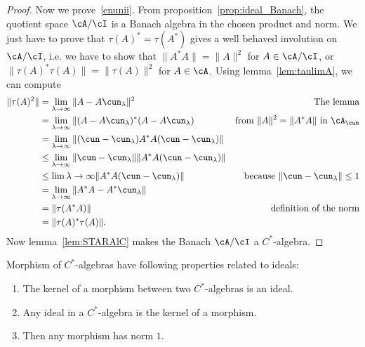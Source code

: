 \begin{proof}
	Now we prove~\ref{enunii}.
	From proposition~\ref{prop:ideal_Banach}, the quotient space $\cA/\cI$ is a Banach algebra in the chosen product and  norm. We just have to prove that $\tau(A)^*=\tau(A^*)$ gives a well behaved involution on $\cA/\cI$, i.e. we have to show that $\| A^*A \|=\| A \|^2$ for $A\in\cA/\cI$, or $\| \tau(A)^*\tau(A) \|=\| \tau(A) \|^2$ for $A\in\cA$. Using lemma~\ref{lem:taulimA}, we can compute
	\begin{equation}
		\begin{aligned}
			\| \tau(A)^2 \| & =\lim_{\lambda\to\infty}\| A-A\cun_{\lambda} \|^2                                   & \textrm{The lemma}                                 \\
			                & =\lim_{\lambda\to\infty}\| (A-A\cun_{\lambda})^*(A-A\cun_{\lambda})                 & \textrm{from $\| A \|^2=\| A^*A \|$
			in $\cA_{\cun}$}                                                                                                                                           \\
			                & =\lim_{\lambda\to\infty}\| (\cun-\cun_{\lambda})A^*A(\cun-\cun_{\lambda}) \|                                                             \\
			                & \leq\lim_{\lambda\to\infty}\| \cun-\cun_{\lambda} \|\| A^*A(\cun-\cun_{\lambda}) \|                                                      \\
			                & \leq\lim{\lambda\to\infty}\| A^*A(\cun-\cun_{\lambda}) \|                           & \textrm{because $\| \cun-\cun_{\lambda} \|\leq 1$} \\
			                & =\lim_{\lambda\to\infty}\| A^*A-A^*\cun_{\lambda} \|                                                                                     \\
			                & =\| \tau(A^*A) \|                                                                   & \textrm{definition of the norm}                    \\
			                & =\| \tau(A)^*\tau(A) \|.
		\end{aligned}
	\end{equation}
	Now lemma~\ref{lem:STARAlC} makes the Banach $\cA/\cI$ a $C^*$-algebra.

\end{proof}

\begin{corollary}
	Morphism of $C^*$-algebras have following properties related to ideals:
	\begin{enumerate}
		\item The kernel of a morphism between two $C^*$-algebras is an ideal.  \label{enupi}
		\item Any ideal in a $C^*$-algebra is the kernel of a morphism.\label{enupii}
		\item Then any morphism has norm $1$.\label{enupiii}
	\end{enumerate}
\end{corollary}

